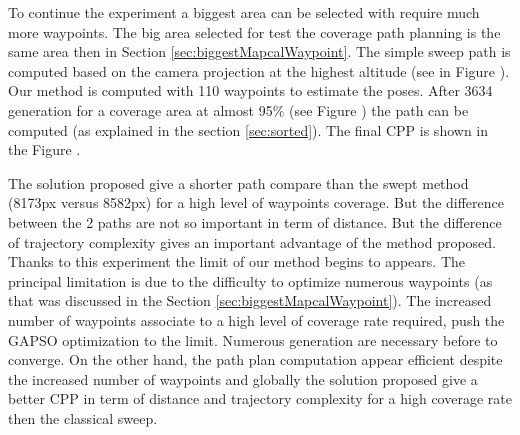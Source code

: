 To continue the experiment a biggest area can be selected with require much more waypoints. The big area selected for test the coverage path planning is the same area then in Section \ref{sec:biggestMapcalWaypoint}. 
The simple sweep path is computed based on the camera projection at the highest altitude (see in Figure ). Our method is computed  with 110 waypoints to estimate the poses. After 3634 generation for a coverage area at almost 95\% (see Figure ) the path  can be computed (as explained in the section \ref{sec:sorted}).  The final CPP is shown in the Figure . 

The solution proposed give a shorter path compare than the swept method (8173px versus 8582px) for a high level of waypoints coverage. But the difference between the 2 paths are not so important  %
in term of distance. But the difference of trajectory complexity gives an important advantage of the method proposed.\\
Thanks to this experiment the limit of our method begins to appears. The principal limitation is due to the difficulty to optimize numerous waypoints (as that was discussed in the Section \ref{sec:biggestMapcalWaypoint}). The increased number of waypoints associate to a high level of coverage rate required, push the GAPSO optimization to the limit. Numerous generation are necessary before to converge. On the other hand, the path plan computation appear efficient despite the increased number of waypoints and globally the solution proposed give a better CPP in term of distance and trajectory complexity for a high coverage rate then the classical sweep.


 
 
